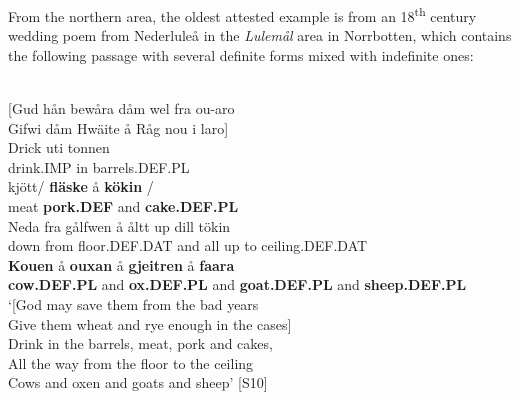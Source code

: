 \ea\label{}
	\z	
\z

From the northern area, the oldest attested example is from an 18\textsuperscript{th} century wedding poem from Nederluleå in the \textit{Lulemål} area in Norrbotten, which contains the following passage with several definite forms mixed with indefinite ones:

\ea \label{} 
\\
{}[Gud hån bewåra dåm wel fra ou-aro\\
Gifwi dåm Hwäite å Råg nou i laro]\\
\gll Drick  uti  tonnen\\
drink.IMP  in  barrels.DEF.PL\\
\gll kjött/  \textbf{fläske}  å  \textbf{kökin}  /\\
meat  \textbf{pork.DEF} and  \textbf{cake.DEF.PL} \\
\gll Neda  fra  gålfwen  å  åltt  up  dill  tökin\\
down  from  floor.DEF.DAT  and  all  up  to  ceiling.DEF.DAT\\
\gll \textbf{Kouen} å  \textbf{ouxan} å  \textbf{gjeitren} å  \textbf{faara} \\
\textbf{cow.DEF.PL} and  \textbf{ox.DEF.PL} and  \textbf{goat.DEF.PL} and  \textbf{sheep.DEF.PL} \\
\glt ‘[God may save them from the bad years\\
Give them wheat and rye enough in the cases]\\
Drink in the barrels, meat, pork and cakes,\\
All the way from the floor to the ceiling\\
Cows and oxen and goats and sheep’ [S10]

